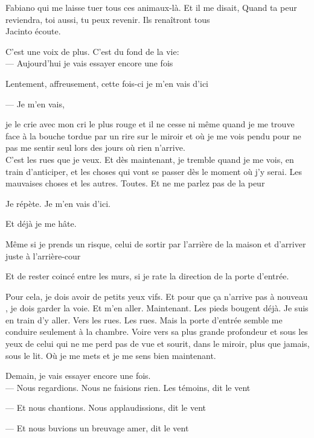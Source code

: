 Fabiano qui me laisse tuer tous ces animaux-là. Et il me disait, Quand
ta peur reviendra, toi aussi, tu peux revenir. Ils renaîtront tous\\

Jacinto écoute.

C'est une voix de plus. C'est du fond de la vie:\\

--- Aujourd'hui je vais essayer encore une fois

Lentement, affreusement, cette fois-ci je m'en vais d'ici

--- Je m'en vais,

je le crie avec mon cri le plus rouge et il ne cesse ni même quand je me
trouve face à la bouche tordue par un rire sur le miroir et où je me
vois pendu pour ne pas me sentir seul lors des jours où rien n'arrive.\\

C'est les rues que je veux. Et dès maintenant, je tremble quand je me
vois, en train d'anticiper, et les choses qui vont se passer dès le
moment où j'y serai. Les mauvaises choses et les autres. Toutes. Et ne
me parlez pas de la peur

Je répète. Je m'en vais d'ici.

Et déjà je me hâte.

Même si je prends un risque, celui de sortir par l'arrière de la maison
et d'arriver juste à l'arrière-cour

Et de rester coincé entre les murs, si je rate la direction de la porte
d'entrée.

Pour cela, je dois avoir de petits yeux vifs. Et pour que ça n'arrive
pas à nouveau , je dois garder la voie. Et m'en aller. Maintenant. Les
pieds bougent déjà. Je suis en train d'y aller. Vers les rues. Les rues.
Mais la porte d'entrée semble me conduire seulement à la chambre. Voire
vers sa plus grande profondeur et sous les yeux de celui qui ne me perd
pas de vue et sourit, dans le miroir, plus que jamais, sous le lit. Où
je me mets et je me sens bien maintenant.

Demain, je vais essayer encore une fois.\\

--- Nous regardions. Nous ne faisions rien. Les témoins, dit le vent

--- Et nous chantions. Nous applaudissions, dit le vent

--- Et nous buvions un breuvage amer, dit le vent\\

